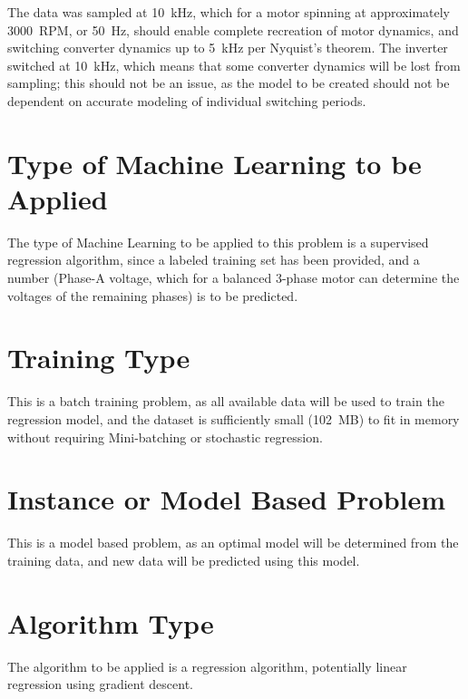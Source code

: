 \documentclass[11pt,letterpaper]{article}
\begin{document}
The data was sampled at \SI{10}{\kHz}, which for a motor spinning at approximately \SI{3000}{RPM}, or \SI{50}{\Hz}, should enable complete recreation of motor dynamics, and switching converter dynamics up to \SI{5}{\kHz} per Nyquist's theorem.
The inverter switched at \SI{10}{\kHz}, which means that some converter dynamics will be lost from sampling; this should not be an issue, as the model to be created should not be dependent on accurate modeling of individual switching periods. 

\section{Type of Machine Learning to be Applied}

The type of Machine Learning to be applied to this problem is a supervised regression algorithm, since a labeled training set has been provided, and a number (Phase-A voltage, which for a balanced 3-phase motor can determine the voltages of the remaining phases) is to be predicted. 

\section{Training Type}

This is a batch training problem, as all available data will be used to train the regression model, and the dataset is sufficiently small (\SI{102}{MB}) to fit in memory without requiring Mini-batching or stochastic regression.

\section{Instance or Model Based Problem}

This is a model based problem, as an optimal model will be determined from the training data, and new data will be predicted using this model.

\section{Algorithm Type}

The algorithm to be applied is a regression algorithm, potentially linear regression using gradient descent.

\printbibliography
\end{document}
